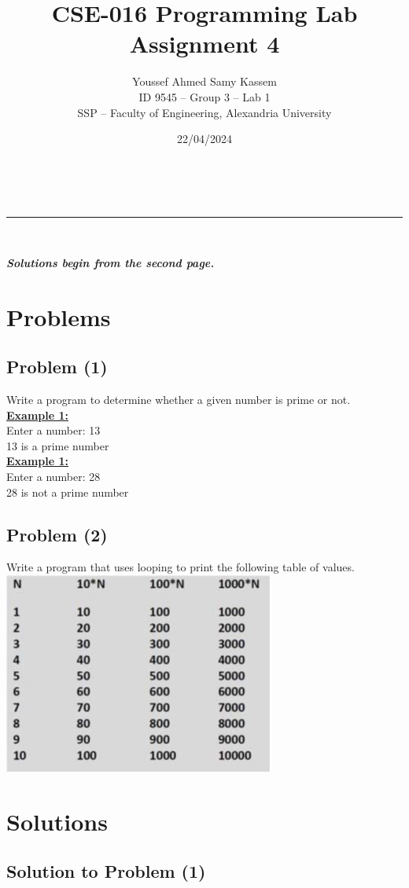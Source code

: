 \documentclass[a4paper,11pt]{article}
\makeatletter
\renewcommand\tableofcontents{%
    \section*{\makebox[\linewidth][c]{\contentsname}%
      \@mkboth{\MakeUppercase\contentsname}{\MakeUppercase\contentsname}}%
    \begin{multicols}{2}%
    \@starttoc{toc}%
    \end{multicols}
    }
\newcommand{\linia}{\rule{\linewidth}{0.5pt}}
\theoremstyle{mytheor}
\theoremstyle{mytheor}
\renewcommand{\maketitle}{
\begin{center}
\vspace{2ex}
{\huge \textsf{\textbf{\@title}}}
\vspace{1ex}
\\
\linia\\
\textsf{\@date \hfill
\@author}
\vspace{4ex}
\end{center}
}
\makeatother
\begin{document}
\title{CSE-016 Programming Lab Assignment \textnumero{} 4}

\date{22/04/2024}

\author{Youssef Ahmed Samy Kassem\\ \hfill ID 9545 -- Group 3 -- Lab 1\\ \hfill SSP -- Faculty of Engineering, Alexandria University\\}

\maketitle
\textsf{\textsl{\textbf{Solutions begin from the second page.}}}
\section{Problems}
\subsection{Problem (1)}
Write a program to determine whether a given number is prime or not.\\
\textbf{\underline{Example 1:}}\\
Enter a number: 13\\
13 is a prime number\\
\textbf{\underline{Example 1:}}\\
Enter a number: 28\\
28 is not a prime number
\subsection{Problem (2)}
Write a program that uses looping to print the following table of values.\\
\includegraphics[width=0.5\linewidth]{image.png}
\tableofcontents
\newpage
\section{Solutions}
\subsection{Solution to Problem (1)}
\end{document}
